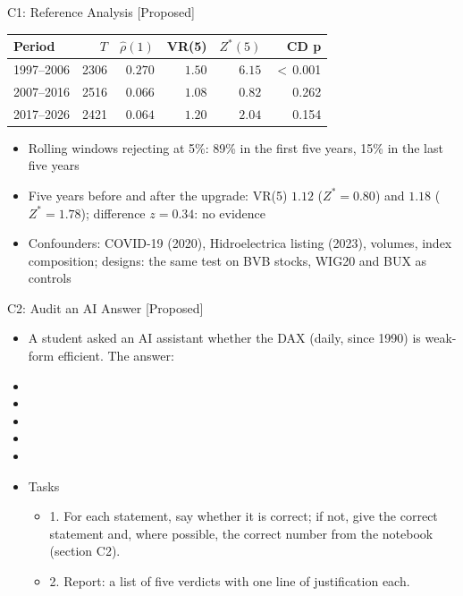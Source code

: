 \ifsolutions
\begin{frame}{C1: Reference Analysis [Proposed]}
\itemsize{\footnotesize}
\begin{center}
\footnotesize
\begin{tabular}{lrrrrr}
\toprule
Period & $T$ & $\hat\rho(1)$ & VR(5) & $Z^*(5)$ & CD p \\
\midrule
1997--2006 & 2306 & $0.270$ & $1.50$ & $6.15$ & $<$\,0.001 \\
2007--2016 & 2516 & $0.066$ & $1.08$ & $0.82$ & 0.262 \\
2017--2026 & 2421 & $0.064$ & $1.20$ & $2.04$ & 0.154 \\
\bottomrule
\end{tabular}
\end{center}
\begin{itemize}
    \item Rolling windows rejecting at 5\%: 89\% in the first five years, 15\% in the last five years
    \item Five years before and after the upgrade: VR(5) $1.12$ ($Z^* = 0.80$) and $1.18$ ($Z^* = 1.78$); difference $z = 0.34$: no evidence
    \item Confounders: COVID-19 (2020), Hidroelectrica listing (2023), volumes, index composition; designs: the same test on BVB stocks, WIG20 and BUX as controls
\end{itemize}
\end{frame}
\fi

\begin{frame}{C2: Audit an AI Answer [Proposed]}
\itemsize{\scriptsize}
\begin{itemize}
    \item A student asked an AI assistant whether the DAX (daily, since 1990) is weak-form efficient. The answer:
    \item {}
    \item {}
    \item {}
    \item {}
    \item {}
    \item Tasks
    \begin{itemize}
        \item 1. For each statement, say whether it is correct; if not, give the correct statement and, where possible, the correct number from the notebook (section C2).
        \item 2. Report: a list of five verdicts with one line of justification each.
    \end{itemize}
\end{itemize}
\end{frame}

